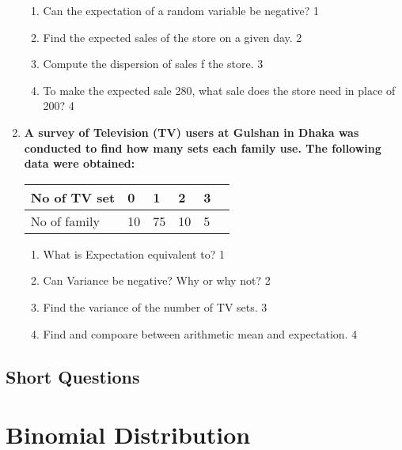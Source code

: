 \documentclass[a4paper,oneside, margin=1.4in]{book}
\begin{document}
\begin{enumerate}
  \begin{enumerate}
    \item
	Can the expectation of a random variable be negative? \hfill 1
    \item
    	Find the expected sales of the store on a given day. \hfill 2
    \item
    	Compute the dispersion of sales f the store. \hfill 3
     \item
     	To make the expected sale 280, what sale does the store need in place of 200? \hfill 4
  \end{enumerate}
  
     \item
	  \textbf{A survey of Television (TV) users at Gulshan in Dhaka was conducted to find how many sets each family use. The following data were obtained:} 
	  
	  	  \begin{table}[h]
	  \begin{center}
\begin{tabular}{llllll}
No of TV set    & 0 & 1  & 2 & 3    \\ \hline
No of family & 10 & 75 & 10 & 5
\end{tabular}
\end{center}	
\end{table}
  
  \begin{enumerate}
    \item
	What is Expectation equivalent to? \hfill 1
    \item
	Can Variance be negative? Why or why not? \hfill 2
    \item  
	Find the variance of the number of TV sets. \hfill 3
    \item
	Find and compoare between arithmetic mean and expectation. \hfill 4
  \end{enumerate}
  \end{enumerate}
\section{Short Questions}

\chapter{Binomial Distribution} 
\end{document}
